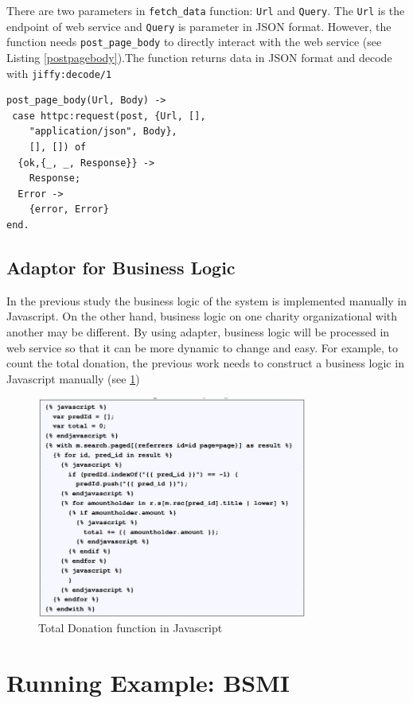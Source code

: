 \documentclass[conference]{IEEEtran}
\begin{document}
There are two parameters in \texttt{fetch\_data} function: \texttt{Url} and \texttt{Query}. The \texttt{Url} is the endpoint of web service and \texttt{Query} is parameter in JSON format. However, the function needs \texttt{post\_page\_body} to directly interact with the web service (see Listing \ref{postpagebody}).The function returns data in JSON format and decode with \texttt{jiffy:decode/1} 

\begin{lstlisting}[caption=Implementation of post\_page\_body function, label=postpagebody]
post_page_body(Url, Body) ->
 case httpc:request(post, {Url, [], 
    "application/json", Body},
    [], []) of
  {ok,{_, _, Response}} ->
    Response;
  Error ->
    {error, Error}
end.
\end{lstlisting} 

\subsection{Adaptor for Business Logic}
In the previous study \cite{bravyto} the business logic of the system is implemented manually in Javascript. On the other hand, business logic on one charity organizational with another may be different. By using adapter, business logic will be processed in web service so that it can be more dynamic to change and easy. For example, to count the total donation, the previous work \cite{bravyto} needs to construct a business logic in Javascript manually (see \ref{samplejs})

\begin{figure}[h]
\centering
\includegraphics[width=3.5in]{totaldonationjs}

\caption{Total Donation function in Javascript}
\label{samplejs}
\end{figure}


\section{Running Example: BSMI}
\end{document}
